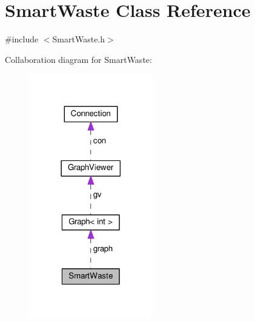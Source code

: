 \hypertarget{classSmartWaste}{}\section{Smart\+Waste Class Reference}
\label{classSmartWaste}


{\ttfamily \#include $<$Smart\+Waste.\+h$>$}



Collaboration diagram for Smart\+Waste\+:
\nopagebreak
\begin{figure}[H]
\begin{center}
\leavevmode
\includegraphics[width=153pt]{classSmartWaste__coll__graph}
\end{center}
\end{figure}
